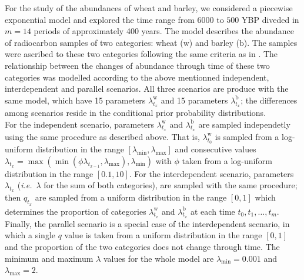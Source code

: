 \documentclass[a4paper]{article}
\begin{document}
For the study of the abundances of wheat and barley, we considered a piecewise exponential model and explored the time range from $6000$ to $500$ YBP diveded in $m=14$ periods of approximately 400 years. The model describes the abundance of radiocarbon samples of two categories: wheat ($\mathrm{w}$) and barley ($\mathrm{b}$). The samples were ascribed to these two categories following the same criteria as in \textcite{Bevan2017a}. The relationship between the changes of abundance through time of these two categories was modelled according to the above mentionned independent, interdependent and parallel scenarios. All three scenarios are produce with the same model, which have 15 parameters $\lambda^\mathrm{w}_{t_x}$ and 15 parameters $\lambda^\mathrm{b}_{t_x}$; the differences among scenarios reside in the conditional prior probability distributions.
\\


For the independent scenario, parameters $\lambda^\mathrm{w}_{t_x}$ and $\lambda^\mathrm{b}_{t_x}$ are sampled independetly using the same procedure as described above. That is, $\lambda^\mathrm{w}_{t_0}$ is sampled from a log-uniform distribution in the range $\left[\lambda_{\min},\lambda_{\max}\right]$ and consecutive values $\lambda_{t_x}=\max(\min(\phi\lambda_{t_{x-1}},\lambda_{\max}),\lambda_{\min})$ with $\phi$ taken from a log-uniform distribution in the range $\left[0.1,10\right]$. For the interdependent scenario, parameters $\lambda_{t_x}$ (\emph{i.e.}\ $\lambda$ for the sum of both categories), are sampled with the same procedure; then $q_{t_x}$ are sampled from a uniform distribution in the range $[0,1]$ which determines the proportion of categories $\lambda^\mathrm{w}_{t_x}$ and $\lambda^\mathrm{b}_{t_x}$ at each time $t_0, t_1, \dots , t_{m}$. Finally, the parallel scenario is a special case of the interdependent scenario, in which a single $q$ value is taken from a uniform distribution in the range $[0,1]$ and the proportion of the two categories does not change through time. The minimum and maximum $\lambda$ values for the whole model are $\lambda_{\min}=0.001$ and $\lambda_{\max}=2$.
\\


\end{document}
